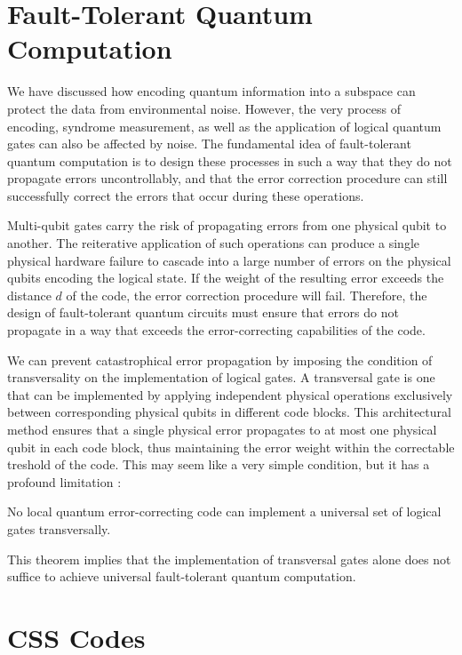 \documentclass[12pt, twoside, openany]{book}
\begin{document}
\section{Fault-Tolerant Quantum Computation}

We have discussed how encoding quantum information into a subspace can protect the data from environmental noise. However, the very process of encoding, syndrome measurement, as well as the application of logical quantum gates can also be affected by noise. The fundamental idea of fault-tolerant quantum computation is to design these processes in such a way that they do not propagate errors uncontrollably, and that the error correction procedure can still successfully correct the errors that occur during these operations. 

Multi-qubit gates carry the risk of propagating errors from one physical qubit to another. The reiterative application of such operations can produce a single physical hardware failure to cascade into a large number of errors on the physical qubits encoding the logical state. If the weight of the resulting error exceeds the distance $d$ of the code, the error correction procedure will fail. Therefore, the design of fault-tolerant quantum circuits must ensure that errors do not propagate in a way that exceeds the error-correcting capabilities of the code. 

We can prevent catastrophical error propagation by imposing the condition of transversality on the implementation of logical gates. A transversal gate is one that can be implemented by applying independent physical operations exclusively between corresponding physical qubits in different code blocks. This architectural method ensures that a single physical error propagates to at most one physical qubit in each code block, thus maintaining the error weight within the correctable treshold of the code. This may seem like a very simple condition, but it has a profound limitation \cite{Eastin2009}:

\begin{theorem}
No local quantum error-correcting code can implement a universal set of logical gates transversally.
\end{theorem}

This theorem implies that the implementation of transversal gates alone does not suffice to achieve universal fault-tolerant quantum computation.

\section{CSS Codes}
\end{document}
